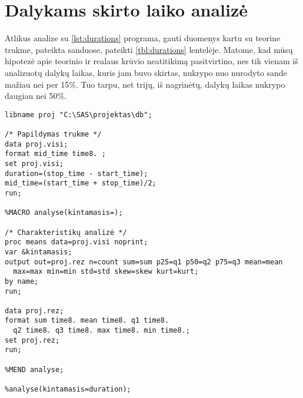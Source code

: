 \section{Dalykams skirto laiko analizė}

Atlikus analize su \ref{lst:durations} programa, gauti duomenys kartu 
su teorine trukme, pateikta sanduose, pateikti \ref{tbl:durations}
lentelėje. Matome, kad mūsų hipotezė apie teorinio ir realaus
krūvio neatitikimą pasitvirtino, nes tik vienam iš analizuotų
dalykų laikas, kuris jam buvo skirtas, nukrypo nuo nurodyto sande
mažiau nei per 15\%. Tuo tarpu, net trijų, iš nagrinėtų, dalykų
laikas nukrypo daugiau nei 50\%.

\begin{listing}[H]
  \begin{verbatim}
libname proj "C:\SAS\projektas\db";

/* Papildymas trukme */
data proj.visi;
format mid_time time8. ;
set proj.visi;
duration=(stop_time - start_time);
mid_time=(start_time + stop_time)/2;
run;

%MACRO analyse(kintamasis=);

/* Charakteristikų analizė */
proc means data=proj.visi noprint;
var &kintamasis;
output out=proj.rez n=count sum=sum p25=q1 p50=q2 p75=q3 mean=mean
  max=max min=min std=std skew=skew kurt=kurt;
by name;
run;

data proj.rez;
format sum time8. mean time8. q1 time8. 
  q2 time8. q3 time8. max time8. min time8.;
set proj.rez;
run;

%MEND analyse;

%analyse(kintamasis=duration);
  \end{verbatim}
  \caption{SAS programa naudota trukmės suskaičiavimui.}
  \label{lst:durations}
\end{listing}

